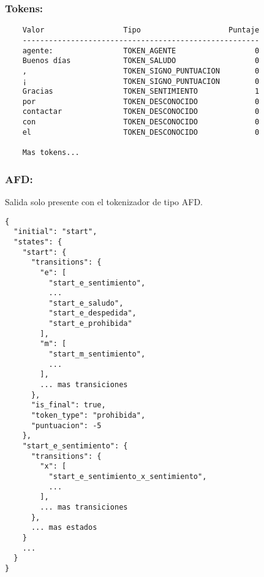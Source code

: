 \subsubsection*{Tokens:}
\begin{tcolorbox}[colback=gray!10, colframe=gray!80, sharp corners, boxrule=0.5pt]
	\begin{verbatim}
	Valor                  Tipo                    Puntaje
	------------------------------------------------------
	agente:                TOKEN_AGENTE                  0
	Buenos días            TOKEN_SALUDO                  0
	,                      TOKEN_SIGNO_PUNTUACION        0
	¡                      TOKEN_SIGNO_PUNTUACION        0
	Gracias                TOKEN_SENTIMIENTO             1
	por                    TOKEN_DESCONOCIDO             0
	contactar              TOKEN_DESCONOCIDO             0
	con                    TOKEN_DESCONOCIDO             0
	el                     TOKEN_DESCONOCIDO             0

    Mas tokens...
\end{verbatim}
\end{tcolorbox}

\subsubsection*{AFD:}
Salida solo presente con el tokenizador de tipo AFD.
\begin{tcolorbox}[colback=gray!10, colframe=gray!80, sharp corners, boxrule=0.5pt]
    \begin{verbatim}
{
  "initial": "start",
  "states": {
    "start": {
      "transitions": {
        "e": [
          "start_e_sentimiento", 
          ...
          "start_e_saludo", 
          "start_e_despedida", 
          "start_e_prohibida"
        ],
        "m": [
          "start_m_sentimiento",
          ...
        ],
        ... mas transiciones
      },
      "is_final": true,
      "token_type": "prohibida",
      "puntuacion": -5
    },
    "start_e_sentimiento": {
      "transitions": {
        "x": [
          "start_e_sentimiento_x_sentimiento",
          ...
        ],
        ... mas transiciones
      },
      ... mas estados
    }
    ...
  }
}
\end{verbatim}
\end{tcolorbox}
